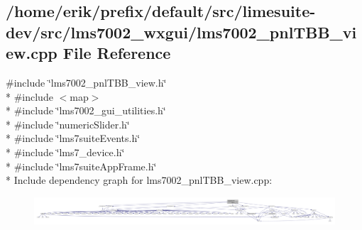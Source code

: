 \subsection{/home/erik/prefix/default/src/limesuite-\/dev/src/lms7002\+\_\+wxgui/lms7002\+\_\+pnl\+T\+B\+B\+\_\+view.cpp File Reference}
\label{lms7002__pnlTBB__view_8cpp}
{\ttfamily \#include \char`\"{}lms7002\+\_\+pnl\+T\+B\+B\+\_\+view.\+h\char`\"{}}\\*
{\ttfamily \#include $<$map$>$}\\*
{\ttfamily \#include \char`\"{}lms7002\+\_\+gui\+\_\+utilities.\+h\char`\"{}}\\*
{\ttfamily \#include \char`\"{}numeric\+Slider.\+h\char`\"{}}\\*
{\ttfamily \#include \char`\"{}lms7suite\+Events.\+h\char`\"{}}\\*
{\ttfamily \#include \char`\"{}lms7\+\_\+device.\+h\char`\"{}}\\*
{\ttfamily \#include \char`\"{}lms7suite\+App\+Frame.\+h\char`\"{}}\\*
Include dependency graph for lms7002\+\_\+pnl\+T\+B\+B\+\_\+view.\+cpp\+:
\nopagebreak
\begin{figure}[H]
\begin{center}
\leavevmode
\includegraphics[width=350pt]{df/dc3/lms7002__pnlTBB__view_8cpp__incl}
\end{center}
\end{figure}

